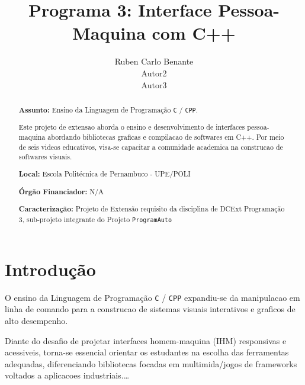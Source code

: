 \documentclass[a4paper,12pt]{article} %
\title{Programa 3: Interface Pessoa-Maquina com C++}
\author{Ruben Carlo Benante \\ Autor2 \\ Autor3}
\begin{document}
\maketitle



\begin{abstract}

\textbf{Assunto:} Ensino da Linguagem de Programação \texttt{C} / \texttt{CPP}.

Este projeto de extensao aborda o ensino e desenvolvimento de interfaces pessoa-maquina abordando bibliotecas graficas e compilacao de softwares em C++. Por meio de seis videos educativos, visa-se capacitar a comunidade academica na construcao de softwares visuais.

\textbf{Local:} Escola Politécnica de Pernambuco - UPE/POLI

\textbf{Órgão Financiador:} N/A

\textbf{Caracterização:} Projeto de Extensão requisito da disciplina de DCExt Programação 3, sub-projeto integrante do Projeto \texttt{ProgramAuto}


\end{abstract}


\section{Introdução}


O ensino da Linguagem de Programação \texttt{C} / \texttt{CPP} expandiu-se da manipulacao em linha de comando para a construcao de sistemas visuais interativos e graficos de alto desempenho.

Diante do desafio de projetar interfaces homem-maquina (IHM) responsivas e acessiveis, torna-se essencial orientar os estudantes na escolha das ferramentas adequadas, diferenciando bibliotecas focadas em multimida/jogos de frameworks voltados a aplicacoes industriais.\ldots
\end{document}
